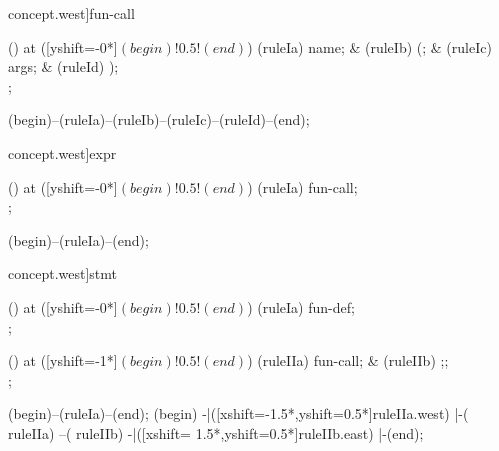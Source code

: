 \begin{syntax}[[xshift=22mm]concept.west]{fun-call}
  
  \node[sequence,column sep=1.5cm] () at ([yshift=-0*\syntaxruledist]$(begin)!0.5!(end)$) {
    \node[terminal]    (ruleIa) {name};
    &
    \node[terminal]    (ruleIb) {(};
    &
    \node[nonterminal] (ruleIc) {args};
    &
    \node[terminal]    (ruleId) {)};
    \\
  };
  
  \draw[path] (begin)--(ruleIa)--(ruleIb)--(ruleIc)--(ruleId)--(end);
\end{syntax}

\begin{syntax}[[xshift=22mm]concept.west]{expr}
  
  \node[sequence,column sep=1.5cm] () at ([yshift=-0*\syntaxruledist]$(begin)!0.5!(end)$) {
    \node[nonterminal] (ruleIa) {fun-call};
    \\
  };
  
  \draw[path] (begin)--(ruleIa)--(end);
\end{syntax}

\begin{syntax}[[xshift=22mm]concept.west]{stmt}
  
  \node[sequence,column sep=1.5cm] () at ([yshift=-0*\syntaxruledist]$(begin)!0.5!(end)$) {
    \node[nonterminal] (ruleIa) {fun-def};
    \\
  };
  
  \node[sequence,column sep=1.5cm] () at ([yshift=-1*\syntaxruledist]$(begin)!0.5!(end)$) {
    \node[nonterminal] (ruleIIa) {fun-call};
    &
    \node[terminal]    (ruleIIb) {;};
    \\
  };
  
  \draw[path] (begin)--(ruleIa)--(end);
  \draw[path] (begin)
            -|([xshift=-1.5*\syntaxruledist,yshift=0.5*\syntaxruledist]ruleIIa.west)
            |-(                                                         ruleIIa)
            --(                                                         ruleIIb)
            -|([xshift= 1.5*\syntaxruledist,yshift=0.5*\syntaxruledist]ruleIIb.east)
            |-(end);
\end{syntax}

